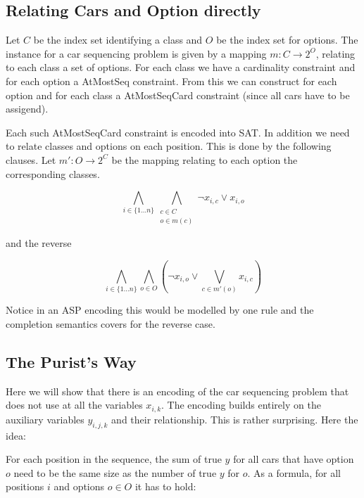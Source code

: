 \documentclass[]{llncs}
\begin{document}
\subsection{Relating Cars and Option directly}

Let $C$ be the index set identifying a class and $O$ be the index set
for options. The instance for a car sequencing problem is given by a
mapping $m : C\rightarrow 2^O$, relating to each class a set of options.
For each class we have a cardinality constraint and for each option a
AtMostSeq constraint. From this we can construct for each option and for
each class a AtMostSeqCard constraint (since all cars have to be
assigend). 

Each such AtMostSeqCard constraint is encoded into SAT. In addition we
need to relate classes and options on each position. This is done by the
following clauses.  Let $m':O \rightarrow 2^C$ be the mapping relating
to each option the corresponding classes. 

\begin{equation}
    \bigwedge_{i\in \{1\ldots n\}} \bigwedge_{\substack{c \in C \\ o \in m(c)}} \neg x_{i,c} \vee x_{i,o}
\end{equation}

and the reverse

\begin{equation}
    \bigwedge_{i \in \{1\dots n\}} \bigwedge_{o\in O} \left(\neg x_{i,o} \vee
    \bigvee_{c \in m'(o)} x_{i,c}\right)
\end{equation}

Notice in an ASP encoding this would be modelled by one rule and the
completion semantics covers for the reverse case. 

\subsection{The Purist's Way}

Here we will show that there is an encoding of the car sequencing
problem that does not use at all the variables $x_{i,k}$. The encoding
builds entirely on the auxiliary variables $y_{i,j,k}$ and their
relationship. This is rather surprising. Here the idea: 

For each position in the sequence, the
sum of true $y$ for all cars that have option $o$ need to be the same
size as the number of true $y$ for $o$. As a formula, for all positions
$i$ and options $ o \in O$ it has to hold: 
\end{document}
